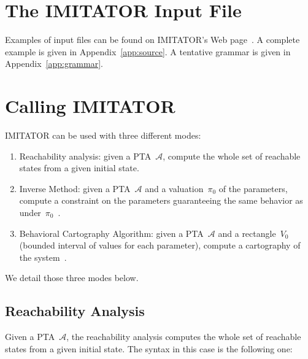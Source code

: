\documentclass[a4paper,11pt]{report}
\newcommand{\A}{\mathcal{A}}
\newcommand{\imitator}{\textsf{IMITATOR}}
\begin{document}
\section{The \imitator{} Input File}

Examples of input files can be found on \imitator{}'s Web page~\cite{imitator}.
A complete example is given in Appendix~\ref{app:source}.
A tentative grammar is given in Appendix~\ref{app:grammar}.



\section{Calling \imitator}

\imitator{} can be used with three different modes:

\begin{enumerate}
	\item Reachability analysis: given a PTA~$\A$, compute the whole set of reachable states from a given initial state.
	\item Inverse Method: given a PTA~$\A$ and a valuation~$\pi_0$ of the parameters, compute a constraint on the parameters guaranteeing the same behavior as under~$\pi_0$~\cite{AS13}.
	\item Behavioral Cartography Algorithm: given a PTA~$\A$ and a rectangle~$V_0$ (bounded interval of values for each parameter), compute a cartography of the system~\cite{AF10}.
\end{enumerate}

We detail those three modes below.



\subsection{Reachability Analysis} \label{ss:mode_reachability}

Given a PTA~$\A$, the reachability analysis computes the whole set of reachable states from a given initial state.
The syntax in this case is the following one:
\end{document}
